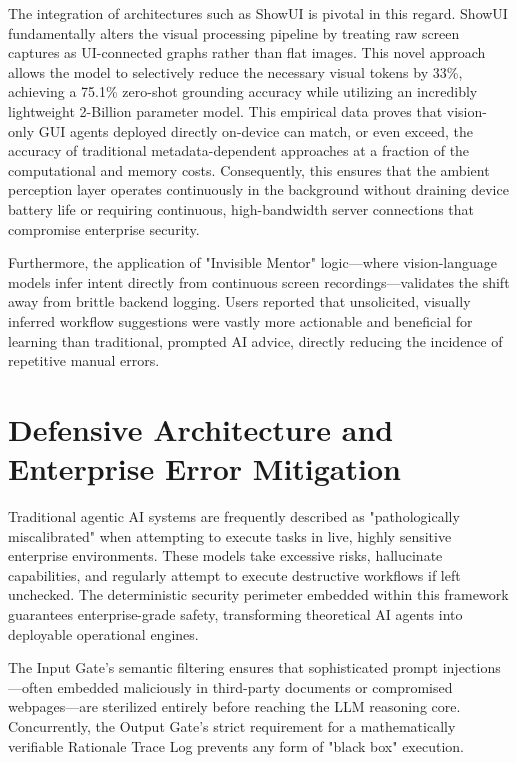 \documentclass[12pt, a4paper]{report}
\begin{document}
The integration of architectures such as ShowUI is pivotal in this regard. ShowUI fundamentally alters the visual processing pipeline by treating raw screen captures as UI-connected graphs rather than flat images. This novel approach allows the model to selectively reduce the necessary visual tokens by 33\%, achieving a 75.1\% zero-shot grounding accuracy while utilizing an incredibly lightweight 2-Billion parameter model.\cite{hojo2025} This empirical data proves that vision-only GUI agents deployed directly on-device can match, or even exceed, the accuracy of traditional metadata-dependent approaches at a fraction of the computational and memory costs.\cite{hojo2025} Consequently, this ensures that the ambient perception layer operates continuously in the background without draining device battery life or requiring continuous, high-bandwidth server connections that compromise enterprise security.

Furthermore, the application of "Invisible Mentor" logic—where vision-language models infer intent directly from continuous screen recordings—validates the shift away from brittle backend logging. Users reported that unsolicited, visually inferred workflow suggestions were vastly more actionable and beneficial for learning than traditional, prompted AI advice, directly reducing the incidence of repetitive manual errors.\cite{hojo2025}

\section{Defensive Architecture and Enterprise Error Mitigation}
Traditional agentic AI systems are frequently described as "pathologically miscalibrated" when attempting to execute tasks in live, highly sensitive enterprise environments. These models take excessive risks, hallucinate capabilities, and regularly attempt to execute destructive workflows if left unchecked.\cite{redpilllabs2026} The deterministic security perimeter embedded within this framework guarantees enterprise-grade safety, transforming theoretical AI agents into deployable operational engines.\cite{redpilllabs2026}

The Input Gate's semantic filtering ensures that sophisticated prompt injections—often embedded maliciously in third-party documents or compromised webpages—are sterilized entirely before reaching the LLM reasoning core.\cite{hojo2025} Concurrently, the Output Gate's strict requirement for a mathematically verifiable Rationale Trace Log prevents any form of "black box" execution.\cite{hojo2025}
\end{document}
